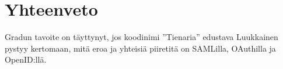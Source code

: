 \documentclass[finnish,gradu]{tktltiki}
\begin{document}

\section{Yhteenveto} %
\label{sec:yhteenveto}

  Gradun tavoite on täyttynyt, jos koodinimi ''Tienaria'' edustava Luukkainen pystyy kertomaan, mitä eroa ja yhteisiä piiretitä on SAMLilla, OAuthilla ja OpenID:llä.





\lastpage
\end{document}
